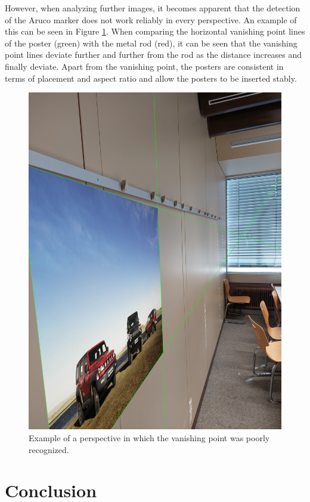 \documentclass[a4paper,twocolumn]{article}
\begin{document}
However, when analyzing further images, it becomes apparent that the detection of the Aruco marker does not work reliably in every perspective. An example of this can be seen in Figure \ref{fig:bad-example-result}. When comparing the horizontal vanishing point lines of the poster (green) with the metal rod (red), it can be seen that the vanishing point lines deviate further and further from the rod as the distance increases and finally deviate.
Apart from the vanishing point, the posters are consistent in terms of placement and aspect ratio and allow the posters to be inserted stably.\begin{figure}[h!]
    \centering
    \includegraphics[width=0.9\columnwidth]{img/img_result_bad_113437.jpg} %
    \caption{Example of a perspective in which the vanishing point was poorly recognized.}
    \label{fig:bad-example-result}
\end{figure}

\section{Conclusion}
\end{document}
